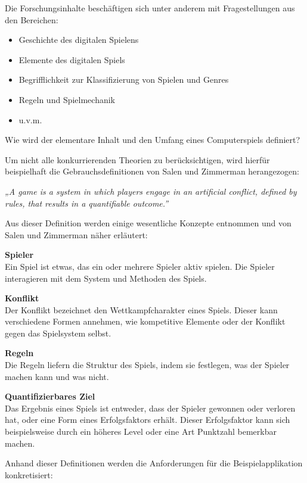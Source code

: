 \pagebreak

Die Forschungsinhalte beschäftigen sich unter anderem mit Fragestellungen aus den Bereichen:

\begin{itemize}
	\item Geschichte des digitalen Spielens
	\item Elemente des digitalen Spiels
	\item Begrifflichkeit zur Klassifizierung von Spielen und Genres
	\item Regeln und Spielmechanik
	\item u.v.m.
\end{itemize}


Wie wird der elementare Inhalt und den Umfang eines Computerspiels definiert?

\bigskip
Um nicht alle konkurrierenden Theorien zu berücksichtigen, wird hierfür beispielhaft die Gebrauchsdefinitionen von Salen und Zimmerman herangezogen:

\bigskip
\emph{„A game is a system in which players engage in an artificial conflict, defined by rules, that results in a quantifiable outcome.”} \citep[80]{salen_zimmerman}
\bigskip

Aus dieser Definition werden einige wesentliche Konzepte entnommen und von Salen und Zimmerman näher erläutert:

\bigskip
\textbf{Spieler}\\
Ein Spiel ist etwas, das ein oder mehrere Spieler aktiv spielen. Die Spieler interagieren mit dem System und Methoden des Spiels.

\bigskip
\textbf{Konflikt}\\
Der Konflikt bezeichnet den Wettkampfcharakter eines Spiels. Dieser kann verschiedene Formen annehmen, wie kompetitive Elemente oder der Konflikt gegen das Spielsystem selbst. 

\bigskip
\textbf{Regeln}\\
Die Regeln liefern die Struktur des Spiels, indem sie festlegen, was der Spieler machen kann und was nicht.

\bigskip
\textbf{Quantifizierbares Ziel}\\
Das Ergebnis eines Spiels ist entweder, dass der Spieler gewonnen oder verloren hat, oder eine Form eines Erfolgsfaktors erhält. Dieser Erfolgsfaktor kann sich beispielsweise durch ein höheres Level oder eine Art Punktzahl bemerkbar machen. 

\bigskip
Anhand dieser Definitionen werden die Anforderungen für die Beispielapplikation konkretisiert:

